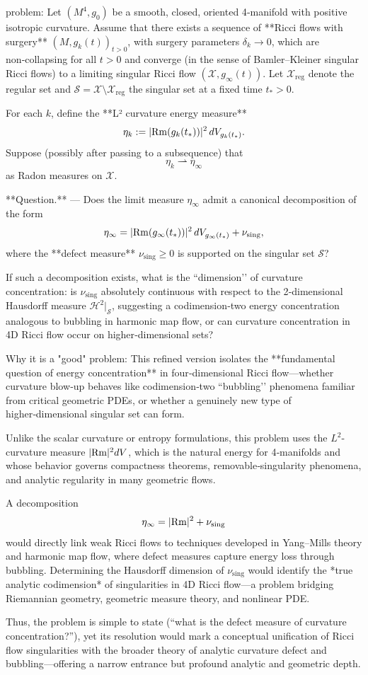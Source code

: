 problem:  
Let \( (M^4, g_0) \) be a smooth, closed, oriented 4‑manifold with positive isotropic curvature.  
Assume that there exists a sequence of **Ricci flows with surgery** \( (M, g_k(t))_{t>0} \), with surgery parameters \(\delta_k \to 0\), which are non‑collapsing for all \(t>0\) and converge (in the sense of Bamler–Kleiner singular Ricci flows) to a limiting singular Ricci flow \((\mathcal{X}, g_\infty(t))\).  
Let \(\mathcal{X}_{\mathrm{reg}}\) denote the regular set and \(\mathcal{S} = \mathcal{X} \setminus \mathcal{X}_{\mathrm{reg}}\) the singular set at a fixed time \(t_*>0\).

For each \(k\), define the **L² curvature energy measure**
\[
\eta_k := |{\rm Rm}(g_k(t_*))|^2 \, dV_{g_k(t_*)}.
\]
Suppose (possibly after passing to a subsequence) that
\[
\eta_k \rightharpoonup \eta_\infty
\]
as Radon measures on \(\mathcal{X}\).  

**Question.** —  
Does the limit measure \(\eta_\infty\) admit a canonical decomposition of the form  
\[
\eta_\infty = |{\rm Rm}(g_\infty(t_*))|^2\, dV_{g_\infty(t_*)} + \nu_{\mathrm{sing}},
\]
where the **defect measure** \( \nu_{\mathrm{sing}} \ge 0 \) is supported on the singular set \(\mathcal{S}\)?  

If such a decomposition exists, what is the “dimension’’ of curvature concentration:  
is \(\nu_{\mathrm{sing}}\) absolutely continuous with respect to the 2‑dimensional Hausdorff measure \(\mathcal{H}^2|_{\mathcal{S}}\), suggesting a codimension‑two energy concentration analogous to bubbling in harmonic map flow, or can curvature concentration in 4D Ricci flow occur on higher‑dimensional sets?  

Why it is a "good" problem:  
This refined version isolates the **fundamental question of energy concentration** in four‑dimensional Ricci flow—whether curvature blow‑up behaves like codimension‑two “bubbling’’ phenomena familiar from critical geometric PDEs, or whether a genuinely new type of higher‑dimensional singular set can form.  

Unlike the scalar curvature or entropy formulations, this problem uses the \(L^2\)-curvature measure \(|{\rm Rm}|^2 dV\), which is the natural energy for 4‑manifolds and whose behavior governs compactness theorems, removable‑singularity phenomena, and analytic regularity in many geometric flows.  

A decomposition
\[
\eta_\infty = |{\rm Rm}|^2 + \nu_{\mathrm{sing}}
\]
would directly link weak Ricci flows to techniques developed in Yang–Mills theory and harmonic map flow, where defect measures capture energy loss through bubbling. Determining the Hausdorff dimension of \(\nu_{\mathrm{sing}}\) would identify the *true analytic codimension* of singularities in 4D Ricci flow—a problem bridging Riemannian geometry, geometric measure theory, and nonlinear PDE.  

Thus, the problem is simple to state (“what is the defect measure of curvature concentration?”), yet its resolution would mark a conceptual unification of Ricci flow singularities with the broader theory of analytic curvature defect and bubbling—offering a narrow entrance but profound analytic and geometric depth.